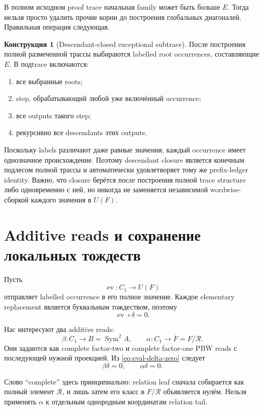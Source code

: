 \documentclass[11pt,a4paper]{article}
\theoremstyle{definition}
\newtheorem{construction}[theorem]{Конструкция}
\theoremstyle{remark}
\newcommand{\Sym}{\operatorname{Sym}}
\newcommand{\Rel}{\mathcal R}
\newcommand{\ev}{\operatorname{ev}}
\newcommand{\barF}{\overline F}
\begin{document}
В полном исходном proof trace начальная family может быть больше $E$. Тогда
нельзя просто удалить прочие корни до построения глобальных диагоналей.
Правильная операция следующая.

\begin{construction}[Descendant-closed exceptional subtrace]
После построения полной размеченной трассы выбираются labelled root
occurrences, составляющие $E$. В подtrace включаются:
\begin{enumerate}
\item все выбранные roots;
\item step, обрабатывающий любой уже включённый occurrence;
\item все outputs такого step;
\item рекурсивно все descendants этих outputs.
\end{enumerate}
\end{construction}

Поскольку labels различают даже равные значения, каждый occurrence имеет
однозначное происхождение. Поэтому descendant closure является конечным
подлесом полной трассы и автоматически удовлетворяет тому же prefix-ledger
identity. Важно, что closure берётся \emph{после} построения полной trace
structure либо одновременно с ней, но никогда не заменяется независимой
wordwise-сборкой каждого значения в $U(F)$.

\section{Additive reads и сохранение локальных тождеств}

Пусть
\[
 \ev:C_1\longrightarrow U(F)
\]
отправляет labelled occurrence в его полное значение. Каждое elementary
replacement является буквальным тождеством, поэтому
\begin{equation}\label{eq:eval-delta-zero}
 \ev\circ\delta=0.
\end{equation}

Нас интересуют два additive reads:
\[
 \beta:C_1\longrightarrow B=\Sym^2A,
 \qquad
 \alpha:C_1\longrightarrow\barF=F/\Rel.
\]
Они задаются как complete factor-two и complete factor-one PBW reads с
последующей нужной проекцией. Из \eqref{eq:eval-delta-zero} следует
\begin{equation}\label{eq:reads-delta-zero}
 \beta\delta=0,
 \qquad
 \alpha\delta=0.
\end{equation}

Слово ``complete'' здесь принципиально: relation leaf сначала собирается как
полный элемент $\Rel$, и лишь затем его класс в $F/\Rel$ объявляется нулём.
Нельзя применять $\alpha$ к отдельным однородным координатам relation tail.
\end{document}
